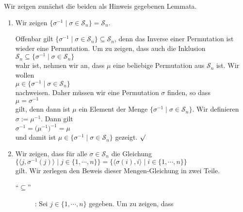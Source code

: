 \solution
Wir zeigen zun\"achst die beiden als Hinweis gegebenen Lemmata.
\begin{enumerate}
\item Wir zeigen  $\{ \sigma^{-1} \mid \sigma \in \mathcal{S}_n \} = \mathcal{S}_n$.

      Offenbar gilt $\{ \sigma^{-1} \mid \sigma \in \mathcal{S}_n \} \subseteq \mathcal{S}_n$, denn das Inverse einer Permutation ist wieder eine Permutation. 
      Um zu zeigen, dass auch die Inklusion
      \\[0.2cm]
      \hspace*{1.3cm}
      $\mathcal{S}_n \subseteq \{ \sigma^{-1} \mid \sigma \in \mathcal{S}_n \}$
      \\[0.2cm]
      wahr ist, nehmen wir an, dass $\mu$ eine beliebige Permutation aus $\mathcal{S}_n$ ist.  Wir wollen 
      \\[0.2cm]
      \hspace*{1.3cm}
      $\mu \in \{ \sigma^{-1} \mid \sigma \in \mathcal{S}_n \}$ 
      \\[0.2cm]
      nachweisen.  Daher m\"ussen wir
      eine Permutation $\sigma$ finden, so dass
      \\[0.2cm]
      \hspace*{1.3cm}
      $\mu = \sigma^{-1}$
      \\[0.2cm]
      gilt, denn dann ist $\mu$ ein Element der Menge $\{ \sigma^{-1} \mid \sigma \in \mathcal{S}_n \}$.
      Wir definieren $\sigma := \mu^{-1}$.  Dann gilt
      \\[0.2cm]
      \hspace*{1.3cm}
      $\sigma^{-1} = \bigl(\mu^{-1}\bigr)^{-1} = \mu$
      \\[0.2cm]
      und damit ist  $\mu \in \{ \sigma^{-1} \mid \sigma \in \mathcal{S}_n \}$ gezeigt.  $\surd$
\item Wir zeigen, dass f\"ur alle $\sigma \in \mathcal{S}_n$ die Gleichung
      \\[0.2cm]
      \hspace*{1.3cm}
      $\bigl\{ \langle j, \sigma^{-1}(j)\rangle \mid j \in \{1,\cdots,n\} \bigr\} = \bigl\{ \langle \sigma(i),i\rangle \mid i \in \{1,\cdots,n\} \bigr\}$
      \\[0.2cm]
      gilt.  Wir zerlegen den Beweis dieser Mengen-Gleichung in zwei Teile.
      \begin{description}
      \item[``$\subseteq$'']:  Sei $j \in \{1, \cdots, n\}$ gegeben.  Um zu zeigen, dass
                     \\[0.2cm]

\end{description}
\end{enumerate}
